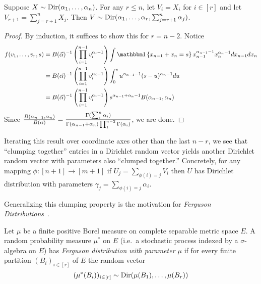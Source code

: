 \begin{proposition}
  Suppose $X \sim \mathrm{Dir}(\alpha_1, \ldots, \alpha_{n})$.
  For any $r \leq n$, let $V_i = X_i$ for $i \in [r]$
  and let $V_{r+1} = \sum_{j=r+1}^n X_j$.
  Then $V \sim \mathrm{Dir}(\alpha_1, \ldots, \alpha_{r}, \sum_{j=r+1}^n \alpha_j)$.
\end{proposition}

\begin{proof}
  By induction, it suffices to show this for $r = n-2$. Notice
  \begin{align*}
    f(v_1, \ldots, v_r, s)
    &= B(\valpha)^{-1} \left(\prod_{i=1}^{n-1} v_i^{\alpha_i - 1}\right)
    \int \ind\left\{
      x_{n-1} + x_n = s
    \right\} x_{n-1}^{\alpha_{n-1} - 1} x_n^{\alpha_n - 1}
    dx_{n-1} dx_n \\
    &= B(\valpha)^{-1} \left(\prod_{i=1}^{n-1} v_i^{\alpha_i - 1}\right)
    \int_0^s u^{\alpha_{n-1} - 1} (s-u)^{\alpha_n - 1} du \\
    &= B(\valpha)^{-1} \left(\prod_{i=1}^{n-1} v_i^{\alpha_i - 1}\right)
    s^{\alpha_{n-1} + \alpha_n - 1} B(\alpha_{n-1}, \alpha_n)
  \end{align*}
  Since $\frac{B(\alpha_{n-1}, \alpha_n)}{B(\vec{\alpha})} = \frac{\Gamma(\sum_1^n \alpha_i)}{\Gamma(\alpha_{n-1} + \alpha_n) \prod_1^{n-2} \Gamma(\alpha_i)}$, we are done.
\end{proof}

Iterating this result over coordinate axes other than the last $n-r$,
we see that ``clumping together'' entries in a Dirichlet
random vector yields another Dirichlet random vector with parameters also
``clumped together.'' Concretely, for any mapping $\phi : [n+1] \to [m+1]$ if
$U_j = \sum_{\phi(i) = j} V_i$ then $U$ has Dirichlet distribution with
parameters $\gamma_j = \sum_{\phi(i) = j} \alpha_i$.

Generalizing this clumping property is the motivation for \emph{Ferguson
Distributions}~\citep{ferguson1973}.

\begin{definition}
  Let $\mu$ be a finite positive Borel measure on complete separable metric
  space $E$.
  A random probability measure $\mu^*$ on $E$ (i.e.\ a stochastic process
  indexed by a $\sigma$-algebra on $E$) has \emph{Ferguson distribution with
  parameter $\mu$} if for every finite partition $(B_i)_{i \in [r]}$ of $E$ the
  random vector 
  \[
    (\mu^*(B_i))_{i \in [r]} \sim \mathrm{Dir}(\mu(B_1), \ldots, \mu(B_r))
  \]
\end{definition}

